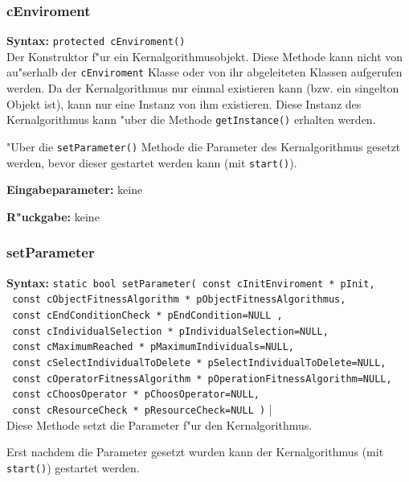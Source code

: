 \subsubsection{cEnviroment}

\textbf{Syntax:} \verb|protected cEnviroment()| \\

Der Konstruktor f"ur ein Kernalgorithmusobjekt. Diese Methode kann nicht von au"serhalb der \verb|cEnviroment| Klasse oder von ihr abgeleiteten Klassen aufgerufen werden. Da der Kernalgorithmus nur einmal existieren kann (bzw. ein singelton Objekt ist), kann nur eine Instanz von ihm existieren. Diese Instanz des Kernalgorithmus kann "uber die Methode \verb|getInstance()| erhalten werden.

"Uber die \verb|setParameter()| Methode die Parameter des Kernalgorithmus gesetzt werden, bevor dieser gestartet werden kann (mit \verb|start()|).

\bigskip\noindent
\textbf{Eingabeparameter:} keine

\bigskip\noindent
\textbf{R"uckgabe:} keine


\subsubsection{setParameter}

\textbf{Syntax:} \verb|static bool setParameter( const cInitEnviroment * pInit,| \\\verb| const cObjectFitnessAlgorithm * pObjectFitnessAlgorithmus,| \\\verb| const cEndConditionCheck * pEndCondition=NULL ,| \\\verb| const cIndividualSelection * pIndividualSelection=NULL,| \\\verb| const cMaximumReached * pMaximumIndividuals=NULL,| \\\verb| const cSelectIndividualToDelete * pSelectIndividualToDelete=NULL,| \\\verb| const cOperatorFitnessAlgorithm * pOperationFitnessAlgorithm=NULL,| \\\verb| const cChoosOperator * pChoosOperator=NULL,| \\\verb| const cResourceCheck * pResourceCheck=NULL )|
| \\

Diese Methode setzt die Parameter f"ur den Kernalgorithmus.

Erst nachdem die Parameter gesetzt wurden kann der Kernalgorithmus (mit \verb|start()|) gestartet werden.

